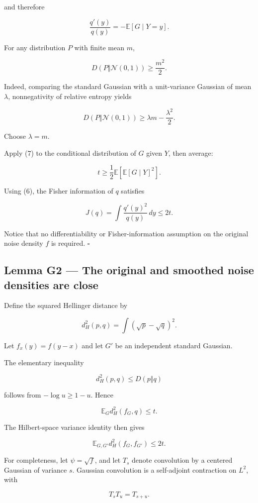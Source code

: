 \documentclass[11pt]{article}
\begin{document}
and therefore

\[
\frac{q'(y)}{q(y)}
=-\mathbb E[G\mid Y=y].
\tag{6}
\]

For any distribution \(P\) with finite mean \(m\),

\[
D(P\Vert\mathcal N(0,1))
\geq\frac{m^2}{2}.
\tag{7}
\]

Indeed, comparing the standard Gaussian with a unit-variance Gaussian of mean \(\lambda\), nonnegativity of relative entropy yields

\[
D(P\Vert\mathcal N(0,1))
\geq\lambda m-\frac{\lambda^2}{2}.
\]

Choose \(\lambda=m\).

Apply (7) to the conditional distribution of \(G\) given \(Y\), then average:

\[
t\geq
\frac12\mathbb E\left[
\mathbb E[G\mid Y]^2
\right].
\]

Using (6), the Fisher information of \(q\) satisfies

\[
\boxed{
J(q)=\int\frac{q'(y)^2}{q(y)}\,dy
\leq2t.
}
\tag{8}
\]

Notice that no differentiability or Fisher-information assumption on the original noise density \(f\) is required. \(\square\)

\subsection{Lemma G2 --- The original and smoothed noise densities are close}

Define the squared Hellinger distance by

\[
d_H^2(p,q)=
\int(\sqrt p-\sqrt q)^2.
\]

Let \(f_x(y)=f(y-x)\) and let \(G'\) be an independent standard Gaussian.

The elementary inequality

\[
d_H^2(p,q)\leq D(p\Vert q)
\]

follows from \(-\log u\geq1-u\). Hence

\[
\mathbb E_G d_H^2(f_G,q)\leq t.
\]

The Hilbert-space variance identity then gives

\[
\mathbb E_{G,G'}
d_H^2(f_G,f_{G'})
\leq2t.
\tag{9}
\]

For completeness, let \(\psi=\sqrt f\), and let \(T_s\) denote convolution by a centered Gaussian of variance \(s\). Gaussian convolution is a self-adjoint contraction on \(L^2\), with

\[
T_sT_u=T_{s+u}.
\]
\end{document}
